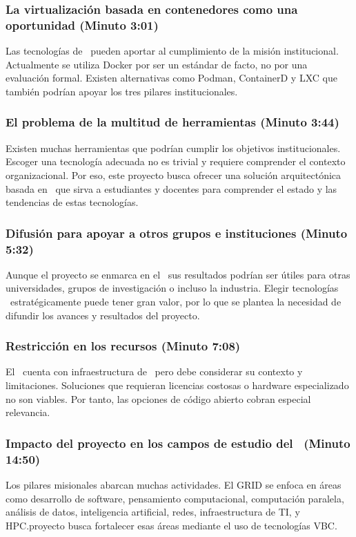 \subsubsection{La virtualización basada en contenedores como una oportunidad (Minuto 3:01)}
Las tecnologías de \VBC\ pueden aportar al cumplimiento de la misión institucional. Actualmente se utiliza Docker por ser un estándar de facto, no por una evaluación formal. Existen alternativas como Podman, ContainerD y LXC que también podrían apoyar los tres pilares institucionales.

\subsubsection{El problema de la multitud de herramientas (Minuto 3:44)}
Existen muchas herramientas que podrían cumplir los objetivos institucionales. Escoger una tecnología adecuada no es trivial y requiere comprender el contexto organizacional. Por eso, este proyecto busca ofrecer una solución arquitectónica basada en \VBC\, que sirva a estudiantes y docentes para comprender el estado y las tendencias de estas tecnologías.

\subsubsection{Difusión para apoyar a otros grupos e instituciones (Minuto 5:32)}
Aunque el proyecto se enmarca en el \GRID\, sus resultados podrían ser útiles para otras universidades, grupos de investigación o incluso la industria. Elegir tecnologías \VBC\ estratégicamente puede tener gran valor, por lo que se plantea la necesidad de difundir los avances y resultados del proyecto.

\subsubsection{Restricción en los recursos (Minuto 7:08)}
El \GRID\ cuenta con infraestructura de \TI\, pero debe considerar su contexto y limitaciones. Soluciones que requieran licencias costosas o hardware especializado no son viables. Por tanto, las opciones de código abierto cobran especial relevancia.

\subsubsection{Impacto del proyecto en los campos de estudio del \GRID\ (Minuto 14:50)}
Los pilares misionales abarcan muchas actividades. El GRID se enfoca en áreas como desarrollo de software, pensamiento computacional, computación paralela, análisis de datos, inteligencia artificial, redes, infraestructura de TI, y HPC.\@Este proyecto busca fortalecer esas áreas mediante el uso de tecnologías VBC.\@

